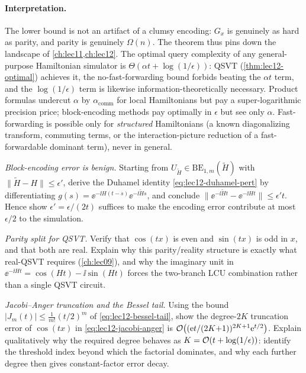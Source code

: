 \paragraph{Interpretation.}
The lower bound is not an artifact of a clumsy encoding: $G_x$ is genuinely as hard as
parity, and parity is genuinely $\Omega(n)$. The theorem thus pins down the landscape of
\cref{ch:lec11,ch:lec12}. The optimal query complexity of any general-purpose Hamiltonian
simulator is $\Theta(\alpha t+\log(1/\epsilon))$: QSVT (\cref{thm:lec12-optimal}) achieves
it, the no-fast-forwarding bound forbids beating the $\alpha t$ term, and the
$\log(1/\epsilon)$ term is likewise information-theoretically necessary. Product formulas
undercut $\alpha$ by $\alpha_{\mathrm{comm}}$ for local Hamiltonians but pay a
super-logarithmic precision price; block-encoding methods pay optimally in $\epsilon$ but
see only $\alpha$. Fast-forwarding is possible only for \emph{structured} Hamiltonians (a
known diagonalizing transform, commuting terms, or the interaction-picture reduction of a
fast-forwardable dominant term), never in general.

\exercisesection

\begin{exercise}\label{ex:lec12-1}
\emph{Block-encoding error is benign.} Starting from
$U_{\tilde H}\in\mathrm{BE}_{1,m}(\tilde H)$ with $\|\tilde H-H\|\le\epsilon'$, derive the
Duhamel identity \eqref{eq:lec12-duhamel-pert} by differentiating
$g(s)=\ee^{-\ii H(t-s)}\ee^{-\ii\tilde Hs}$, and conclude
$\|\ee^{-\ii\tilde Ht}-\ee^{-\ii Ht}\|\le\epsilon' t$. Hence show $\epsilon'=\epsilon/(2t)$
suffices to make the encoding error contribute at most $\epsilon/2$ to the simulation.
\end{exercise}

\begin{exercise}\label{ex:lec12-2}
\emph{Parity split for QSVT.} Verify that $\cos(tx)$ is even and $\sin(tx)$ is odd in $x$,
and that both are real. Explain why this parity/reality structure is exactly what real-QSVT
requires (\cref{ch:lec09}), and why the imaginary unit in $\ee^{-\ii Ht}=\cos(Ht)-\ii
\sin(Ht)$ forces the two-branch LCU combination rather than a single QSVT circuit.
\end{exercise}

\begin{exercise}\label{ex:lec12-3}
\emph{Jacobi--Anger truncation and the Bessel tail.} Using the bound
$|J_m(t)|\le\tfrac1{m!}(t/2)^m$ of \eqref{eq:lec12-bessel-tail}, show the degree-$2K$
truncation error of $\cos(tx)$ in \eqref{eq:lec12-jacobi-anger} is
$\mathcal{O}\bigl((\mathrm{e} t/(2K{+}1))^{2K+1}\mathrm{e}^{t/2}\bigr)$. Explain qualitatively why the required
degree behaves as $K=\mathcal{O}(t+\log(1/\epsilon))$: identify the threshold index beyond which
the factorial dominates, and why each further degree then gives constant-factor error decay.
\end{exercise}


